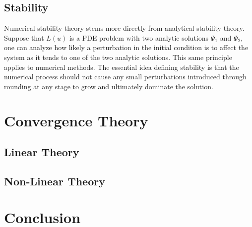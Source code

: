 \documentclass[../main.tex]{subfiles}
\begin{document}
  \subsection{Stability}
  Numerical stability theory stems more directly from analytical stability theory. Suppose that $L(u)$ is a PDE problem with two analytic solutions $\Psi_1$ and $\Psi_2$, one can analyze how likely a perturbation in the initial condition is to affect the system as it tends to one of the two analytic solutions. This same principle applies to numerical methods. The essential idea defining stability is that the numerical process should not cause any small perturbations introduced through rounding at any stage to grow and ultimately dominate the solution.

  \section{Convergence Theory}

  \subsection{Linear Theory}

  \subsection{Non-Linear Theory}

  \section{Conclusion}
\end{document}
